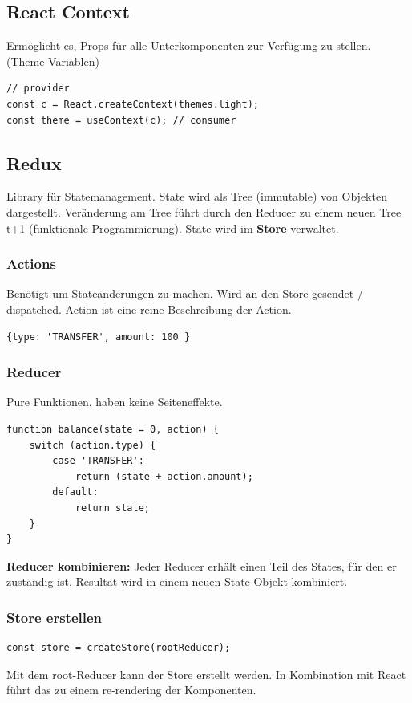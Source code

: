 \subsection{React Context}
Ermöglicht es, Props für alle Unterkomponenten zur Verfügung zu stellen. (Theme Variablen)
\begin{lstlisting}
// provider
const c = React.createContext(themes.light);
const theme = useContext(c); // consumer
\end{lstlisting}

\subsection{Redux}
Library für Statemanagement.
State wird als Tree (immutable) von Objekten dargestellt.
Veränderung am Tree führt durch den Reducer zu einem neuen Tree t+1 (funktionale Programmierung).
State wird im \textbf{Store} verwaltet.

\subsubsection{Actions}
Benötigt um Stateänderungen zu machen.
Wird an den Store gesendet / dispatched.
Action ist eine reine Beschreibung der Action.
\begin{lstlisting}
{type: 'TRANSFER', amount: 100 }
\end{lstlisting}

\subsubsection{Reducer}
Pure Funktionen, haben keine Seiteneffekte.
\begin{lstlisting}
function balance(state = 0, action) {
    switch (action.type) {
        case 'TRANSFER':
            return (state + action.amount);
        default:
            return state;
    }
}
\end{lstlisting}
\textbf{Reducer kombinieren:} Jeder Reducer erhält einen Teil des States, für den er zuständig ist.
Resultat wird in einem neuen State-Objekt kombiniert.

\subsubsection{Store erstellen}
\begin{lstlisting}
const store = createStore(rootReducer);
\end{lstlisting}
Mit dem root-Reducer kann der Store erstellt werden.
In Kombination mit React führt das zu einem re-rendering der Komponenten.

